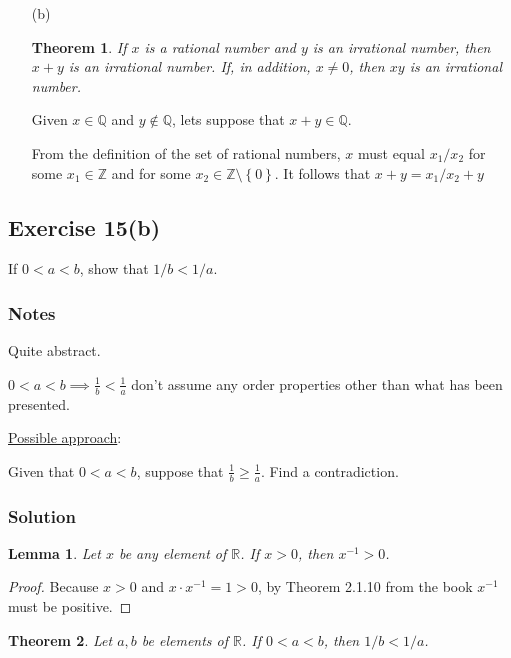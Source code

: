 \documentclass[12pt]{article}
\newtheorem*{thm}{Theorem}
\newtheorem{lem}{Lemma}
\begin{document}
\begin{itemize}
\item[(b)]
\begin{thm}
If $x$ is a rational number and $y$ is an irrational number, then $x + y$ is an irrational number. If, in addition, $x \neq 0$, then $xy$ is an irrational number.
\end{thm}

Given $x \in \mathbb{Q}$ and $y \notin \mathbb{Q}$, lets suppose that $x + y \in \mathbb{Q}$.

From the definition of the set of rational numbers, $x$ must equal $x_1 / x_2$ for some $x_1 \in \mathbb{Z}$ and for some $x_2 \in \mathbb{Z} \setminus \left\{0\right\}$. It follows that $x + y = x_1 / x_2 + y$
\end{itemize}

\subsection*{Exercise 15(b)}
If $0 < a < b$, show that $1/b < 1/a$.

\subsubsection*{Notes}
Quite abstract.

$0 < a < b \implies \frac{1}{b} < \frac{1}{a}$ don't assume any order properties other than what has been presented.

\underline{Possible approach}:

Given that $0 < a < b$, suppose that $\frac{1}{b} \geq \frac{1}{a}$. Find a contradiction.

\subsubsection*{Solution}
\begin{lem}
Let $x$ be any element of $\mathbb{R}$. If $x > 0$, then $x^{-1} > 0$.
\end{lem}

\begin{proof}
Because $x > 0$ and $x \cdot x^{-1} = 1 > 0$, by Theorem 2.1.10 from the book $x^{-1}$ must be positive.
\end{proof}

\begin{thm}
Let $a, b$ be elements of $\mathbb{R}$. If $0 < a < b$, then $1/b < 1/a$.
\end{thm}
\end{document}

